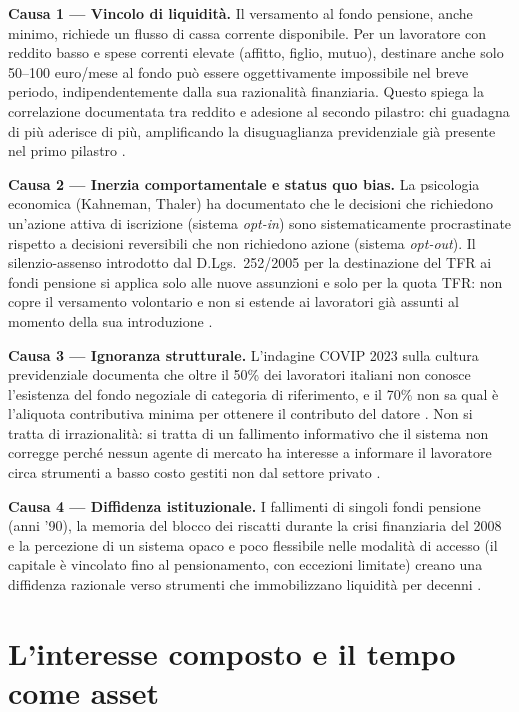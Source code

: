 \medskip
\noindent
\textbf{Causa 1 — Vincolo di liquidità.}
Il versamento al fondo pensione, anche minimo, richiede un flusso di
cassa corrente disponibile.
Per un lavoratore con reddito basso e spese correnti elevate (affitto,
figlio, mutuo), destinare anche solo 50--100 euro/mese al fondo
può essere oggettivamente impossibile nel breve periodo, indipendentemente
dalla sua razionalità finanziaria.
Questo spiega la correlazione documentata tra reddito e adesione
al secondo pilastro: chi guadagna di più aderisce di più, amplificando
la disuguaglianza previdenziale già presente nel primo pilastro
\cite{Bosi2018, COVIP2025}.

\medskip
\noindent
\textbf{Causa 2 — Inerzia comportamentale e status quo bias.}
La psicologia economica (Kahneman, Thaler) ha documentato
che le decisioni che richiedono un'azione attiva di iscrizione
(sistema \emph{opt-in}) sono sistematicamente procrastinate
rispetto a decisioni reversibili che non richiedono azione
(sistema \emph{opt-out}).
Il silenzio-assenso introdotto dal D.Lgs.\ 252/2005 per la
destinazione del TFR ai fondi pensione si applica solo alle
nuove assunzioni e solo per la quota TFR: non copre il versamento
volontario e non si estende ai lavoratori già assunti al momento
della sua introduzione \cite{web:80, Lavoce2024a}.

\medskip
\noindent
\textbf{Causa 3 — Ignoranza strutturale.}
L'indagine COVIP 2023 sulla cultura previdenziale documenta che
oltre il 50\% dei lavoratori italiani non conosce l'esistenza
del fondo negoziale di categoria di riferimento,
e il 70\% non sa qual è l'aliquota contributiva minima per
ottenere il contributo del datore \cite{COVIP2025}.
Non si tratta di irrazionalità: si tratta di un fallimento informativo
che il sistema non corregge perché nessun agente di mercato ha
interesse a informare il lavoratore circa strumenti a basso costo
gestiti non dal settore privato \cite{Lavoce2024a}.

\medskip
\noindent
\textbf{Causa 4 — Diffidenza istituzionale.}
I fallimenti di singoli fondi pensione (anni '90), la memoria
del blocco dei riscatti durante la crisi finanziaria del 2008 e la
percezione di un sistema opaco e poco flessibile nelle modalità di
accesso (il capitale è vincolato fino al pensionamento, con eccezioni
limitate) creano una diffidenza razionale verso strumenti che
immobilizzano liquidità per decenni \cite{Fornero2018}.


\section{L'interesse composto e il tempo come asset}
\label{sec:interesse_composto}

